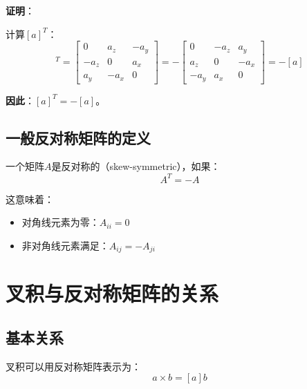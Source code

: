 \documentclass[12pt,a4paper]{article}
\begin{document}
\textbf{证明}：

计算$[a]^T$：
\begin{equation}
[a]^T = \begin{bmatrix}
0 & a_z & -a_y \\
-a_z & 0 & a_x \\
a_y & -a_x & 0
\end{bmatrix} = -\begin{bmatrix}
0 & -a_z & a_y \\
a_z & 0 & -a_x \\
-a_y & a_x & 0
\end{bmatrix} = -[a]
\end{equation}

\textbf{因此}：$[a]^T = -[a]$。

\subsection{一般反对称矩阵的定义}

一个矩阵$A$是反对称的（skew-symmetric），如果：
\begin{equation}
A^T = -A
\end{equation}

这意味着：
\begin{itemize}
\item 对角线元素为零：$A_{ii} = 0$
\item 非对角线元素满足：$A_{ij} = -A_{ji}$
\end{itemize}

\section{叉积与反对称矩阵的关系}

\subsection{基本关系}

叉积可以用反对称矩阵表示为：
\begin{equation}
a \times b = [a] b
\end{equation}
\end{document}
